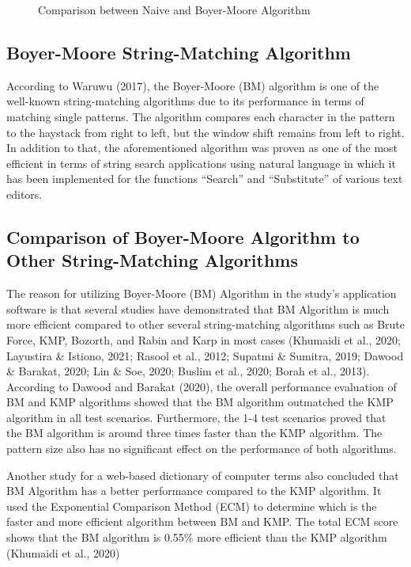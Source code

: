\hfill

\begin{figure}[hbt!]
   \center
    \noindent{}
   \caption{Comparison between Naive and Boyer-Moore Algorithm}
   \label{fig:Boyer-Mooore}
\end{figure}

\subsection*{Boyer-Moore String-Matching Algorithm}
\hspace\parindent
According to Waruwu (2017), the Boyer-Moore (BM) algorithm is one of the well-known string-matching algorithms due to its performance in terms of matching single patterns. The algorithm compares each character in the pattern to the haystack from right to left, but the window shift remains from left to right. In addition to that, the aforementioned algorithm was proven as one of the most efficient in terms of string search applications using natural language in which it has been implemented for the functions “Search” and “Substitute” of various text editors. 

\subsection*{Comparison of Boyer-Moore Algorithm to Other String-Matching Algorithms}

\hspace\parindent
The reason for utilizing Boyer-Moore (BM) Algorithm in the study’s application software is that
several studies have demonstrated that BM Algorithm is much more efficient compared to other several
string-matching algorithms such as Brute Force, KMP, Bozorth, and Rabin and Karp in most cases
(Khumaidi et al., 2020; Layustira \& Istiono, 2021; Rasool et al., 2012; Supatmi \& Sumitra, 2019;
Dawood \& Barakat, 2020; Lin \& Soe, 2020; Buslim et al., 2020; Borah et al., 2013). According to Dawood and Barakat (2020), the overall performance evaluation of BM and KMP algorithms showed that the BM algorithm outmatched the KMP algorithm in all test scenarios. Furthermore, the 1-4 test scenarios proved that the BM algorithm is around three times faster than the KMP algorithm. The pattern size also has no significant effect on the performance of both algorithms. 

\hfill

Another study for a web-based dictionary of computer terms also concluded that BM Algorithm has a
better performance compared to the KMP algorithm. It used the Exponential Comparison Method (ECM) to
determine which is the faster and more efficient algorithm between BM and KMP. The total ECM score
shows that the BM algorithm is 0.55\% more efficient than the KMP algorithm (Khumaidi et al., 2020)


